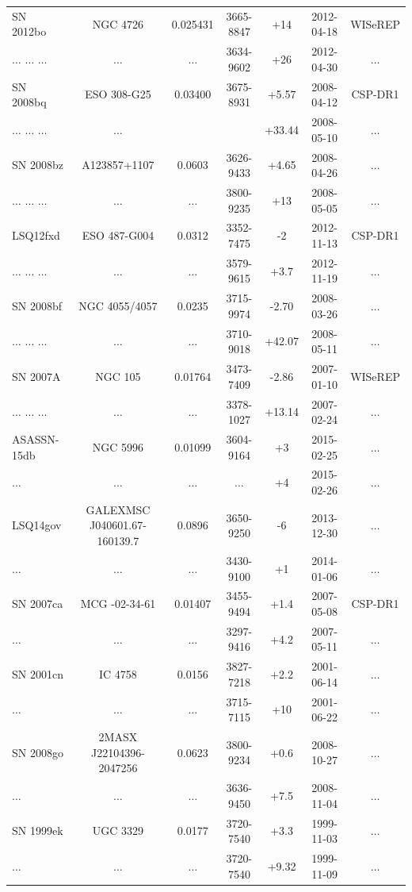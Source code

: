 \documentclass[11pt]{article}
\begin{document}
\begin{table}[htbp]
{\begin{tabular}{lcccccc}
SN 2012bo & NGC 4726 & 0.025431 & 3665-8847 & +14 &
    2012-04-18 & WISeREP \\
    $\dots$ $\dots$ $\dots$ & $\dots$ & $\dots$ & 3634-9602 & +26 &
    2012-04-30 & $\dots$ \\
SN 2008bq & ESO 308-G25 & 0.03400 & 3675-8931 & +5.57  &
    2008-04-12 & CSP-DR1 \\
    $\dots$ $\dots$ $\dots$ & $\dots$ &    &   & +33.44 &
    2008-05-10 & $\dots$ \\
SN 2008bz & A123857+1107 & 0.0603 & 3626-9433 & +4.65 &
    2008-04-26 & $\dots$ \\
    $\dots$ $\dots$ $\dots$ & $\dots$ & $\dots$ & 3800-9235 & +13 &
    2008-05-05 & $\dots$ \\
LSQ12fxd & ESO 487-G004 & 0.0312 & 3352-7475 & -2 & 2012-11-13 &
    CSP-DR1 \\
    $\dots$ $\dots$ $\dots$ & $\dots$ & $\dots$ & 3579-9615 & +3.7 &
    2012-11-19 & $\dots$ \\
SN 2008bf & NGC 4055/4057 & 0.0235 &  3715-9974  & -2.70 &
    2008-03-26 & $\dots$  \\
    $\dots$ $\dots$ $\dots$ & $\dots$ & $\dots$ & 3710-9018 & +42.07 &
    2008-05-11 & $\dots$  \\
SN 2007A & NGC 105 & 0.01764 & 3473-7409 & -2.86 &
    2007-01-10 &  WISeREP \\
    $\dots$ $\dots$ $\dots$ & $\dots$ & $\dots$ & 3378-1027 & +13.14 &
    2007-02-24 & $\dots$  \\
ASASSN-15db & NGC 5996  & 0.01099 & 3604-9164 & +3 & 2015-02-25 &$\dots$ \\
    $\dots$ & $\dots$ & $\dots$ & $\dots$ & +4 & 2015-02-26 & $\dots$\\
LSQ14gov & GALEXMSC J040601.67-160139.7  & 0.0896 & 3650-9250 & -6
     & 2013-12-30 & $\dots$ \\
$\dots$ & $\dots$ & $\dots$ & 3430-9100 & +1 & 2014-01-06 & $\dots$ \\
     SN 2007ca & MCG -02-34-61 & 0.01407 & 3455-9494 & +1.4 & 2007-05-08 &
     CSP-DR1 \\
     $\dots$ & $\dots$ & $\dots$ & 3297-9416 & +4.2 & 2007-05-11 & $\dots$ \\
SN 2001cn & IC 4758 & 0.0156 & 3827-7218 & +2.2 &
     2001-06-14 &  $\dots$ \\
     $\dots$ & $\dots$ & $\dots$ & 3715-7115  & +10  &
     2001-06-22 & $\dots$ \\
SN 2008go & 2MASX J22104396-2047256 & 0.0623 & 3800-9234  & +0.6 &
     2008-10-27 & $\dots$ \\
     $\dots$ & $\dots$ & $\dots$ & 3636-9450 & +7.5 &
     2008-11-04 & $\dots$ \\
SN 1999ek & UGC 3329 & 0.0177 & 3720-7540 & +3.3 &
     1999-11-03 & $\dots$ \\
     $\dots$ & $\dots$ & $\dots$ & 3720-7540 & +9.32  &
     1999-11-09 & $\dots$ \\
   

\end{tabular}}
\end{table}
\end{document}
